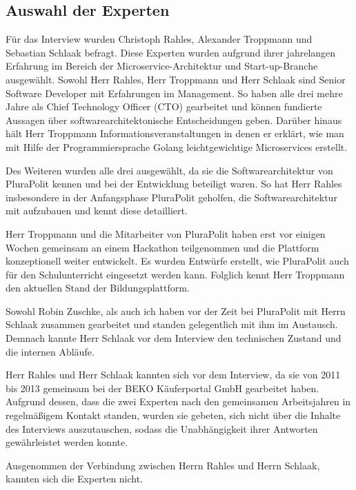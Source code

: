 \subsection{Auswahl der Experten}

Für das Interview wurden Christoph Rahles, Alexander Troppmann und Sebastian Schlaak befragt.
Diese Experten wurden aufgrund ihrer jahrelangen Erfahrung im Bereich der Microservice-Architektur und Start-up-Branche ausgewählt. Sowohl Herr Rahles, Herr Troppmann und Herr Schlaak sind Senior Software Developer mit Erfahrungen im Management. So haben alle drei mehre Jahre als Chief Technology Officer (CTO) gearbeitet und können fundierte Aussagen über softwarearchitektonische Entscheidungen geben. Darüber hinaus hält Herr Troppmann Informationsveranstaltungen in denen er erklärt, wie man mit Hilfe der Programmiersprache Golang leichtgewichtige Microservices erstellt.

Des Weiteren wurden alle drei ausgewählt, da sie die Softwarearchitektur von PluraPolit kennen und bei der Entwicklung beteiligt waren. So hat Herr Rahles insbesondere in der Anfangsphase PluraPolit geholfen, die Softwarearchitektur mit aufzubauen und kennt diese detailliert.

Herr Troppmann und die Mitarbeiter von PluraPolit haben erst vor einigen Wochen gemeinsam an einem Hackathon teilgenommen und die Plattform konzeptionell weiter entwickelt. Es wurden Entwürfe erstellt, wie PluraPolit auch für den Schulunterricht eingesetzt werden kann. Folglich kennt Herr Troppmann den aktuellen Stand der Bildungsplattform.

Sowohl Robin Zuschke, als auch ich haben vor der Zeit bei PluraPolit mit Herrn Schlaak zusammen gearbeitet und standen gelegentlich mit ihm im Austausch. Demnach kannte Herr Schlaak vor dem Interview den technischen Zustand und die internen Abläufe.

Herr Rahles und Herr Schlaak kannten sich vor dem Interview, da sie von 2011 bis 2013 gemeinsam bei der BEKO Käuferportal GmbH gearbeitet haben. Aufgrund dessen, dass die zwei Experten nach den gemeinsamen Arbeitsjahren in regelmäßigem Kontakt standen, wurden sie gebeten, sich nicht über die Inhalte des Interviews auszutauschen, sodass die Unabhängigkeit ihrer Antworten gewährleistet werden konnte.

Ausgenommen der Verbindung zwischen Herrn Rahles und Herrn Schlaak, kannten sich die Experten nicht.
